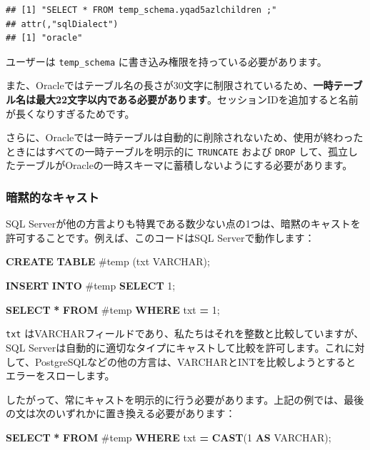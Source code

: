 \documentclass[
  11pt]{book}
\newenvironment{Shaded}{\begin{snugshade}}{\end{snugshade}}
\newcommand{\DataTypeTok}[1]{\textcolor[rgb]{0.13,0.29,0.53}{#1}}
\newcommand{\DecValTok}[1]{\textcolor[rgb]{0.00,0.00,0.81}{#1}}
\newcommand{\FunctionTok}[1]{\textcolor[rgb]{0.13,0.29,0.53}{\textbf{#1}}}
\newcommand{\KeywordTok}[1]{\textcolor[rgb]{0.13,0.29,0.53}{\textbf{#1}}}
\newcommand{\NormalTok}[1]{#1}
\newcommand{\OperatorTok}[1]{\textcolor[rgb]{0.81,0.36,0.00}{\textbf{#1}}}
\newcommand{\StringTok}[1]{\textcolor[rgb]{0.31,0.60,0.02}{#1}}
\theoremstyle{definition}
\theoremstyle{definition}
\theoremstyle{definition}
\theoremstyle{definition}
\theoremstyle{remark}
\begin{document}
\begin{verbatim}
## [1] "SELECT * FROM temp_schema.yqad5azlchildren ;"
## attr(,"sqlDialect")
## [1] "oracle"
\end{verbatim}

ユーザーは \texttt{temp\_schema} に書き込み権限を持っている必要があります。

また、Oracleではテーブル名の長さが30文字に制限されているため、\textbf{一時テーブル名は最大22文字以内である必要があります}。セッションIDを追加すると名前が長くなりすぎるためです。

さらに、Oracleでは一時テーブルは自動的に削除されないため、使用が終わったときにはすべての一時テーブルを明示的に \texttt{TRUNCATE} および \texttt{DROP} して、孤立したテーブルがOracleの一時スキーマに蓄積しないようにする必要があります。

\subsubsection*{暗黙的なキャスト}\label{ux6697ux9ed9ux7684ux306aux30adux30e3ux30b9ux30c8}

SQL Serverが他の方言よりも特異である数少ない点の1つは、暗黙のキャストを許可することです。例えば、このコードはSQL Serverで動作します：

\begin{Shaded}
\begin{Highlighting}[]
\KeywordTok{CREATE} \KeywordTok{TABLE}\NormalTok{ \#temp (txt }\DataTypeTok{VARCHAR}\NormalTok{);}

\KeywordTok{INSERT} \KeywordTok{INTO}\NormalTok{ \#temp}
\KeywordTok{SELECT} \StringTok{\textquotesingle{}1\textquotesingle{}}\NormalTok{;}

\KeywordTok{SELECT} \OperatorTok{*} \KeywordTok{FROM}\NormalTok{ \#temp }\KeywordTok{WHERE}\NormalTok{ txt }\OperatorTok{=} \DecValTok{1}\NormalTok{;}
\end{Highlighting}
\end{Shaded}

\texttt{txt} はVARCHARフィールドであり、私たちはそれを整数と比較していますが、SQL Serverは自動的に適切なタイプにキャストして比較を許可します。これに対して、PostgreSQLなどの他の方言は、VARCHARとINTを比較しようとするとエラーをスローします。

したがって、常にキャストを明示的に行う必要があります。上記の例では、最後の文は次のいずれかに置き換える必要があります：

\begin{Shaded}
\begin{Highlighting}[]
\KeywordTok{SELECT} \OperatorTok{*} \KeywordTok{FROM}\NormalTok{ \#temp }\KeywordTok{WHERE}\NormalTok{ txt }\OperatorTok{=} \FunctionTok{CAST}\NormalTok{(}\DecValTok{1} \KeywordTok{AS} \DataTypeTok{VARCHAR}\NormalTok{);}
\end{Highlighting}
\end{Shaded}
\end{document}
